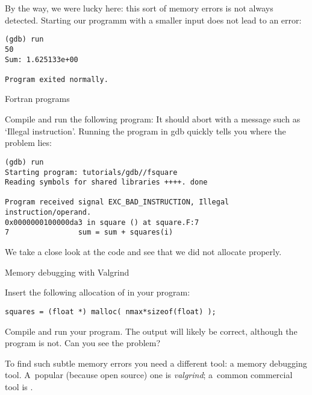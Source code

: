 By the way, we were lucky here: this sort of memory errors is not always
detected. Starting our programm with a smaller input does not lead to
an error:
\begin{verbatim}
(gdb) run
50
Sum: 1.625133e+00

Program exited normally.
\end{verbatim}

 {Fortran programs}

Compile and run the following program:
It should abort with a message such as `Illegal instruction'.
Running the program in gdb quickly tells you where the problem lies:
\begin{verbatim}
(gdb) run
Starting program: tutorials/gdb//fsquare 
Reading symbols for shared libraries ++++. done

Program received signal EXC_BAD_INSTRUCTION, Illegal instruction/operand.
0x0000000100000da3 in square () at square.F:7
7                sum = sum + squares(i)
\end{verbatim}
We take a close look at the code and see that we did not allocate
 properly.

 {Memory debugging with Valgrind}
\label{sec:valgrind}

Insert the following allocation of  in your program:
\begin{verbatim}
squares = (float *) malloc( nmax*sizeof(float) );
\end{verbatim}
Compile and run your program. The output will likely be correct,
although the program is not. Can you see the problem?


To find such subtle memory errors you need a different tool: a memory
debugging tool. A~popular (because open source) one is
\emph{valgrind}; a~common commercial tool is .

